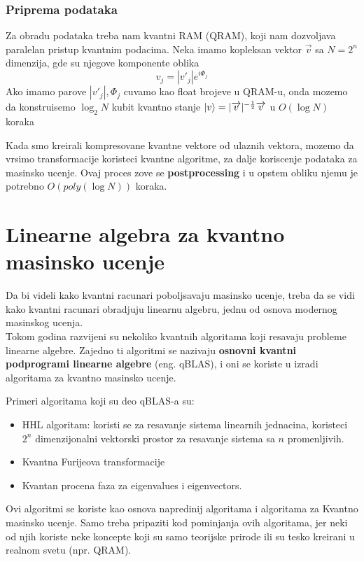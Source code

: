 \documentclass[12pt, letterpaper, oneside]{article}
\begin{document}
\subsubsection{Priprema podataka}
Za obradu podataka treba nam kvantni RAM (QRAM), koji nam dozvoljava paralelan pristup kvantnim podacima. 
Neka imamo kopleksan vektor $\overrightarrow{v}$ sa $N=2^n$ dimenzija, gde su njegove komponente oblika 
\[
    v_j = |v'_j|e^{i\varPhi_j}
\]
Ako imamo parove ${|v'_j|,\varPhi_j}$ cuvamo kao float brojeve u QRAM-u, onda mozemo da konstruisemo
$\log_{2}N$ kubit kvantno stanje $\ket{v} = |\overrightarrow{v}|^{-\frac{1}{2}}\overrightarrow{v}$ u $O(\log N)$ koraka

Kada smo kreirali kompresovane kvantne vektore od ulaznih vektora, mozemo da vrsimo transformacije koristeci kvantne algoritme, za dalje koriscenje podataka za masinsko ucenje.
Ovaj proces zove se \textbf{postprocessing} i u opstem obliku njemu je potrebno $O(poly(\log{}N))$ koraka. \cite{lloyd2013quantum}


\section{Linearne algebra za kvantno masinsko ucenje}
Da bi videli kako kvantni racunari poboljsavaju masinsko ucenje, treba da se vidi kako kvantni racunari obradjuju linearnu algebru, jednu od osnova modernog masinskog ucenja. \\
Tokom godina razvijeni su nekoliko kvantnih algoritama koji resavaju probleme linearne algebre.
Zajedno ti algoritmi se nazivaju \textbf{osnovni kvantni podprogrami linearne algebre} (eng. qBLAS), i oni se koriste u izradi algoritama za kvantno masinsko ucenje.

Primeri algoritama koji su deo qBLAS-a su: 
\begin{itemize}
    \item HHL algoritam: koristi se za resavanje sistema linearnih jednacina, koristeci $2^n$ dimenzijonalni vektorski prostor
        za resavanje sistema sa $n$ promenljivih. \cite{Quantum_machine_learning}
    \item Kvantna Furijeova transformacije \cite{Classical&quantum_info_Fourie_Phase}
    \item Kvantan procena faza za eigenvalues i eigenvectors. \cite{Classical&quantum_info_Fourie_Phase}
\end{itemize}
Ovi algoritmi se koriste kao osnova napredinij algoritama i algoritama za Kvantno masinsko ucenje.
Samo treba pripaziti kod pominjanja ovih algoritama, jer neki od njih koriste neke koncepte koji su samo
teorijske prirode ili su tesko kreirani u realnom svetu (npr. QRAM).
\end{document}
